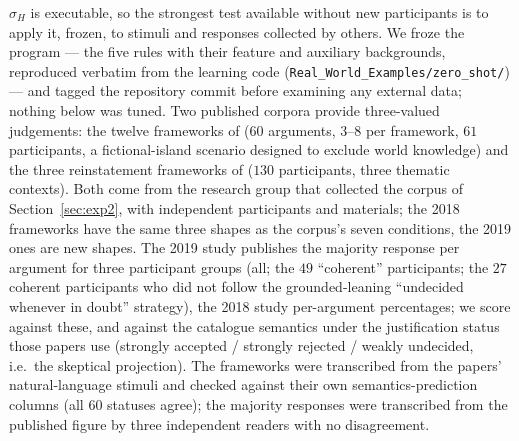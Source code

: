 \documentclass[review,12pt]{elsarticle}
\theoremstyle{definition}
\theoremstyle{remark}
\begin{document}
$\sigma_H$ is executable, so the strongest test available without new
participants is to apply it, frozen, to stimuli and responses collected by
others. We froze the program --- the five rules with their feature and
auxiliary backgrounds, reproduced verbatim from the learning code
(\texttt{Real\_World\_Examples/zero\_shot/}) --- and tagged the repository
commit before examining any external data; nothing below was tuned. Two
published corpora provide three-valued judgements: the twelve frameworks of
\citet{cramer2019jelia} ($60$ arguments, $3$--$8$ per framework, $61$
participants, a fictional-island scenario designed to exclude world
knowledge) and the three reinstatement frameworks of \citet{cramer2018}
($130$ participants, three thematic contexts). Both come from the research
group that collected the corpus of Section~\ref{sec:exp2}, with independent
participants and materials; the 2018 frameworks have the same three shapes as
the corpus's seven conditions, the 2019 ones are new shapes. The 2019 study
publishes the majority response per argument for three participant groups
(all; the $49$ ``coherent'' participants; the $27$ coherent participants who
did not follow the grounded-leaning ``undecided whenever in doubt''
strategy), the 2018 study per-argument percentages; we score against these,
and against the catalogue semantics under the justification status those
papers use (strongly accepted / strongly rejected / weakly undecided, i.e.\
the skeptical projection). The frameworks were transcribed from the papers'
natural-language stimuli and checked against their own semantics-prediction
columns (all $60$ statuses agree); the majority responses were transcribed
from the published figure by three independent readers with no disagreement.
\end{document}
